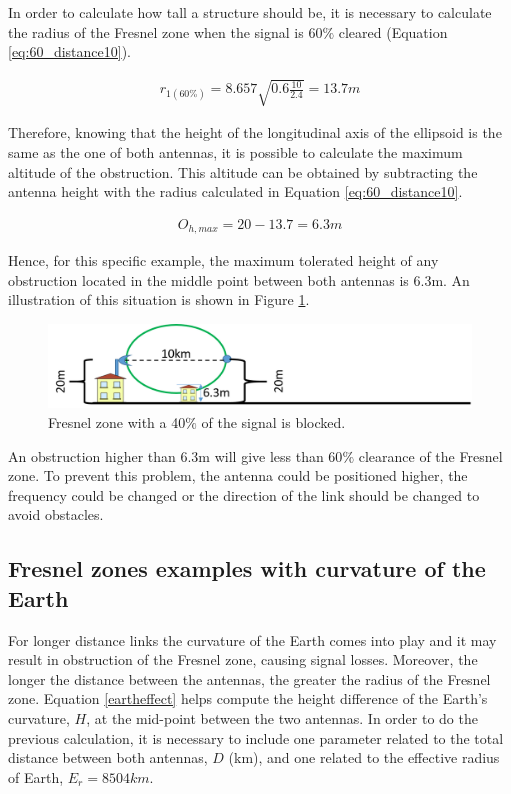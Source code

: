In order to calculate how tall a structure should be, it is necessary to calculate the radius of the Fresnel zone when the signal is 60$\%$ cleared (Equation \ref{eq:60_distance10}).

\begin{align}
r_{1(60\%)} = 8.657\sqrt{0.6 \frac{10}{2.4}} = 13.7m\label{eq:60_distance10}
\end{align}
  
Therefore, knowing that the height of the longitudinal axis of the ellipsoid is the same as the one of both antennas, it is possible to calculate the maximum altitude of the obstruction. This altitude can be obtained by subtracting the antenna height with the radius calculated in Equation \ref{eq:60_distance10}.

\begin{align}
\text{$O_{h,max}$} = 20 - 13.7 = 6.3m\label{eq:height_obstruction}
\end{align}

Hence, for this specific example, the maximum tolerated height of any obstruction located in the middle point between both antennas is 6.3m. An illustration of this situation is shown in Figure \ref{fig:fresnel_zones_10km_60procent}.

\begin{figure}[H]
	\centering
	\includegraphics[scale=0.50]{figures/fresnel_10km_60procent.png}
	\caption{Fresnel zone with a 40$\%$ of the signal is blocked.}
	\label{fig:fresnel_zones_10km_60procent}
\end{figure}  

An obstruction higher than 6.3m will give less than 60$\%$ clearance of the Fresnel zone. To prevent this problem, the antenna could be positioned higher, the frequency could be changed or the direction of the link should be changed to avoid obstacles.

\subsection{Fresnel zones examples with curvature of the Earth}
For longer distance links the curvature of the Earth comes into play and it may result in obstruction of the Fresnel zone, causing signal losses. Moreover, the longer the distance between the antennas, the greater the radius of the Fresnel zone. Equation \ref{eartheffect} helps compute the height difference of the Earth's curvature, $H$, at the mid-point between the two antennas. In order to do the previous calculation, it is necessary to include one parameter related to the total distance between both antennas, $D$ (km), and one related to the effective radius of Earth, $E_r = 8 504 km$.

